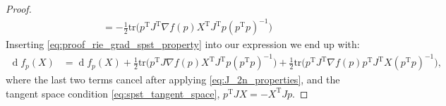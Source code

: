 \begin{proof}
\begin{align}
        &=-\tfrac{1}{2} \mathrm{tr}\big(p ^{\mathrm{T}}J ^{\mathrm{T}} \nabla f(p)X ^{\mathrm{T}}J ^{\mathrm{T}}p(p ^{\mathrm{T}}p)^{-1}\big) \label{eq:proof_rie_grad_spst_property}
    \end{align}
    Inserting \eqref{eq:proof_rie_grad_spst_property} into our expression we end up with:
    \begin{equation*}
        \begin{split}
            \operatorname{d}f_{p}(X)&= \operatorname{d}f_{p}(X)+\tfrac{1}{2} \mathrm{tr}\big(p ^{\mathrm{T}}J \nabla f(p)X ^{\mathrm{T}}J ^{\mathrm{T}}p(p ^{\mathrm{T}}p)^{-1}\big)+\tfrac{1}{2}\mathrm{tr}\big(p ^{\mathrm{T}}J ^{\mathrm{T}}\nabla f(p) p ^{\mathrm{T}}J ^{\mathrm{T}}X(p ^{\mathrm{T}}p)^{-1}\big),
        \end{split}
    \end{equation*}
    where the last two terms cancel after applying \eqref{eq:J_2n_properties}, and the tangent space condition \eqref{eq:spst_tangent_space}, $p ^{\mathrm{T}}JX=-X ^{\mathrm{T}}Jp$.
\end{proof}